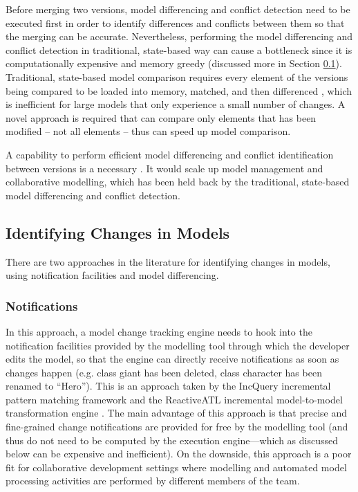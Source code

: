 Before merging two versions, model differencing and conflict detection need to be executed first in order to identify differences and conflicts between them so that the merging can be accurate. Nevertheless, performing the model differencing and conflict detection in traditional, state-based way can cause a bottleneck since it is computationally expensive and memory greedy (discussed more in Section \ref{sec:identifying_changes_in models}). Traditional, state-based model comparison requires every element of the versions being compared to be loaded into memory, matched, and then differenced \cite{emfcompare2018developer}, which is inefficient for large models that only experience a small number of changes. A novel approach is required that can compare only elements that has been modified -- not all elements -- thus can speed up model comparison.

A capability to perform efficient model differencing and conflict identification between versions is a necessary \cite{KolovosRMPGCLRV13}. It would scale up model management and collaborative modelling, which has been held back by the traditional, state-based model differencing and conflict detection.

\subsection{Identifying Changes in Models}
\label{sec:identifying_changes_in models}
There are two approaches in the literature for identifying changes in models, using notification facilities and model differencing.

\subsubsection{Notifications}
\label{sec:notifications}
In this approach, a model change tracking 
engine needs to hook into the notification facilities 
provided by the modelling tool through which the developer edits the model, 
so that the engine can directly receive notifications as soon as 
changes happen (e.g. class \textsf{giant} has been deleted, class \textsf{character} has been renamed to ``Hero''). 
This is an approach taken by the IncQuery incremental pattern matching 
framework \cite{DBLP:conf/ecmdafa/RathHV12} and the ReactiveATL incremental model-to-model 
transformation engine \cite{DBLP:conf/ecmdafa/OgunyomiRK15}. The main advantage of this 
approach is that precise and fine-grained change notifications are provided 
for free by the modelling tool (and thus do not need to be computed by the 
execution engine---which as discussed below can be expensive and inefficient). 
On the downside, this approach is a poor fit for collaborative development 
settings where modelling and automated model processing activities are 
performed by different members of the team.

